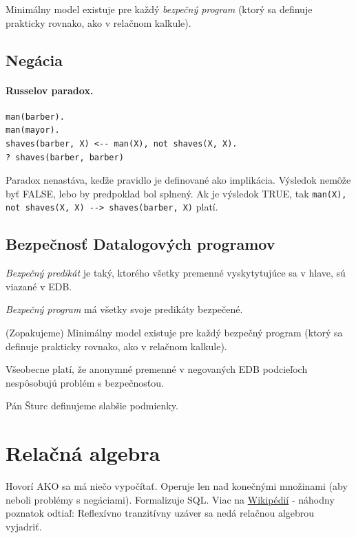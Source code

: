 \documentclass[10pt,a4paper]{article}
\begin{document}
Minimálny model existuje pre každý \emph{bezpečný program} (ktorý sa definuje prakticky rovnako, ako v relačnom kalkule).

\subsection{Negácia}

\paragraph{Russelov paradox.}
\begin{verbatim}
man(barber).
man(mayor).
shaves(barber, X) <-- man(X), not shaves(X, X).
? shaves(barber, barber)
\end{verbatim}

Paradox nenastáva, keďže pravidlo je definované ako implikácia. Výsledok nemôže byť FALSE,
lebo by predpoklad bol splnený. Ak je výsledok TRUE, tak \verb|man(X), not shaves(X, X) --> shaves(barber, X)| platí. 

\subsection{Bezpečnosť Datalogových programov}

\emph{Bezpečný predikát} je taký, ktorého všetky premenné vyskytytujúce sa v hlave, sú viazané v EDB. 

\emph{Bezpečný program} má všetky svoje predikáty bezpečené. 

(Zopakujeme) Minimálny model existuje pre každý bezpečný program (ktorý sa definuje prakticky rovnako, ako v relačnom kalkule).
 
Všeobecne platí, že anonymné premenné v negovaných EDB podcieľoch
nespôsobujú problém s bezpečnosťou.
 
Pán Šturc definujeme slabšie podmienky. 
    
\section{Relačná algebra} 
\label{relacna_algebra}

Hovorí AKO sa má niečo vypočítať. Operuje len nad konečnými množinami (aby neboli problémy s negáciami). Formalizuje SQL. Viac na \href{http://en.wikipedia.org/wiki/Relational_algebra}{Wikipédií} - náhodny poznatok odtiaľ: Reflexívno tranzitívny uzáver sa nedá relačnou algebrou vyjadriť. 
 
\end{document}
